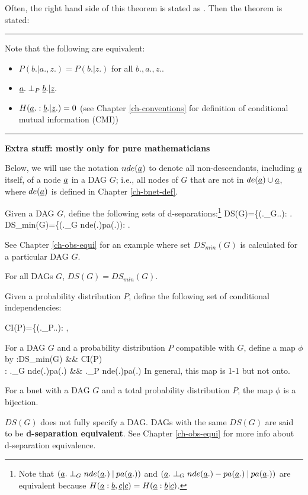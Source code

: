 Often, the right hand side
of this theorem is stated as 
.
Then the theorem is stated:

\hrule
Note that 
the following are equivalent:
\begin{itemize}
\item
$P(b.|a., z.)=P(b.|z.)$ for all $b., a., z.$.
\item
$\rva.\perp_P \rvb.|\rvz.$
\item
$H(\rva.:\rvb.|\rvz.)=0$
(see Chapter \ref{ch-conventions}
for definition of
 conditional mutual information (CMI))
\end{itemize}
\hrule\noindent
{\bf Extra stuff: mostly only for 
 pure mathematicians}

Below, we will use
the notation $nde(\rva)$
to denote
all non-descendants,
including $\rva$ itself, 
of a node $\rva$
in a DAG $G$; i.e.,
all nodes of $G$ that are not
in $de(\rva)\cup \rva$, where
$de(\rva)$
is defined in Chapter \ref{ch-bnet-def}.

Given a DAG $G$, define 
the following
sets of d-separations:\footnote{
Note that
$(\rva.\perp_G
nde(\rva.)\cond pa(\rva.))$ and
$(\rva.\perp_G
nde(\rva.)-pa(\rva.)\cond pa(\rva.))$
are
equivalent
because
$H(\rva:\rvb, \rvc|\rvc)=
H(\rva:\rvb|\rvc)$.
}
\beq
DS(G)=\{(\rva.\perp_G\rvb.\cond\rvz.):
\;.
\eeq
\beq
DS_{min}(G)=\{(\rva.\perp_G
nde(\rva.)\cond pa(\rva.)):
\;.
\eeq

See Chapter \ref{ch-obs-equi}
for an example
where set $DS_{min}(G)$
is calculated for 
a particular DAG $G$.

\begin{claim}
For all DAGs $G$, $DS(G)=DS_{min}(G)$.
\end{claim}

Given a probability distribution  $P$, 
define the following
set of conditional independencies:

\beq
CI(P)=\{(\rva.\perp_P\rvb.\cond \rvz.):
\;,
\eeq


For a DAG $G$
and a probability
distribution $P$
compatible with $G$,
define  a map $\phi$
by
\beqa
\phi:DS_{min}(G) &\rarrow& CI(P)
\\
\phi: \rva.\perp_G nde(\rva.)\cond pa(\rva.)
&\mapsto&
\rva.\perp_P nde(\rva.)\cond pa(\rva.)
\eeqa
In general, this map
is 1-1 but not onto.


\begin{claim}
For a bnet 
with a DAG $G$
and a total probability distribution $P$,
the map $\phi$ is a bijection.
\end{claim}

$DS(G)$
does not fully specify a DAG.
DAGs with the same 
$DS(G)$ are said to be
{\bf d-separation equivalent}.
See Chapter \ref{ch-obs-equi}
for more info about 
d-separation equivalence.
